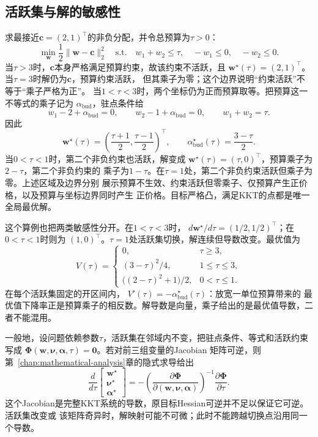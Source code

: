 \subsection{活跃集与解的敏感性}

\begin{example}
\label{ex:opt-kkt-budget}
求最接近$\bm{c}=(2,1)^{\top}$的非负分配，并令总预算为$\tau>0$：
\[
  \min_{\bm{w}}\frac12\lVert\bm{w}-\bm{c}\rVert_2^2
  \quad\text{s.t.}\quad
  w_1+w_2\leq\tau,\quad -w_1\leq0,\quad -w_2\leq0.
\]
当$\tau>3$时，$\bm{c}$本身严格满足预算约束，故该约束不活跃，且
$\bm{w}^{\star}(\tau)=(2,1)^{\top}$。当$\tau=3$时解仍为$\bm{c}$，预算约束活跃，
但其乘子为零；这个边界说明“约束活跃”不等于“乘子严格为正”。
当$1<\tau<3$时，两个坐标仍为正而预算取等。把预算这一不等式的乘子记为
$\alpha_{\mathrm{bud}}$，驻点条件给
\[
  w_1-2+\alpha_{\mathrm{bud}}=0,\qquad
  w_2-1+\alpha_{\mathrm{bud}}=0,\qquad
  w_1+w_2=\tau.
\]
因此
\[
  \bm{w}^{\star}(\tau)
  =\left(\frac{\tau+1}{2},\frac{\tau-1}{2}\right)^{\top},
  \qquad
  \alpha_{\mathrm{bud}}^{\star}(\tau)=\frac{3-\tau}{2}.
\]
当$0<\tau<1$时，第二个非负约束也活跃，解变成
$\bm{w}^{\star}(\tau)=(\tau,0)^{\top}$，预算乘子为$2-\tau$，第二个非负约束的
乘子为$1-\tau$。在$\tau=1$处，第二个非负约束活跃但乘子为零。上述区域及边界分别
展示预算不生效、约束活跃但零乘子、仅预算产生正价格，以及预算与坐标边界同时产生
正价格。目标严格凸，满足KKT的点都是唯一全局最优解。
\end{example}

这个算例也把两类敏感性分开。在$1<\tau<3$时，
$d\bm{w}^{\star}/d\tau=(1/2,1/2)^{\top}$；在$0<\tau<1$时则为
$(1,0)^{\top}$。$\tau=1$处活跃集切换，解连续但导数改变。最优值为
\[
  V(\tau)=
  \begin{cases}
    0, & \tau\geq3,\\
    (3-\tau)^2/4, & 1\leq\tau\leq3,\\
    \bigl((2-\tau)^2+1\bigr)/2, & 0<\tau\leq1.
  \end{cases}
\]
在每个活跃集固定的开区间内，
$V'(\tau)=-\alpha_{\mathrm{bud}}^{\star}(\tau)$：放宽一单位预算带来的
最优值下降率正是预算乘子的相反数。解导数是向量，乘子给出的是最优值导数，二者不能混用。

一般地，设问题依赖参数$\tau$，活跃集在邻域内不变，把驻点条件、等式和活跃约束写成
$\bm{\Phi}(\bm{w},\bm{\nu},\bm{\alpha},\tau)=\bm{0}$。若对前三组变量的Jacobian
矩阵可逆，则第~\ref{chap:mathematical-analysis}章的隐式求导给出
\[
  \frac{d}{d\tau}
  \begin{bmatrix}\bm{w}^{\star}\\\bm{\nu}^{\star}\\\bm{\alpha}^{\star}\end{bmatrix}
  =
  -\left(\frac{\partial\bm{\Phi}}
  {\partial(\bm{w},\bm{\nu},\bm{\alpha})}\right)^{-1}
  \frac{\partial\bm{\Phi}}{\partial\tau}.
\]
这个Jacobian是完整KKT系统的导数，原目标Hessian可逆并不足以保证它可逆。活跃集改变或
该矩阵奇异时，解映射可能不可微；此时不能跨越切换点沿用同一个导数。

